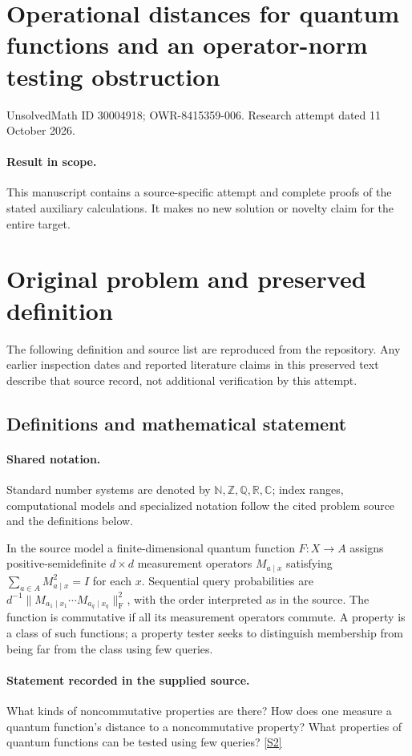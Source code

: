 \documentclass[11pt]{article}
\begin{document}
\section*{Operational distances for quantum functions and an operator-norm testing obstruction}
\noindent UnsolvedMath ID 30004918; OWR-8415359-006. Research attempt dated 11 October 2026.
\paragraph{Result in scope.}This manuscript contains a source-specific attempt and complete proofs of the stated auxiliary calculations. It makes no new solution or novelty claim for the entire target.
\section{Original problem and preserved definition}
The following definition and source list are reproduced from the repository. Any earlier inspection dates and reported literature claims in this preserved text describe that source record, not additional verification by this attempt.
\subsection{Definitions and mathematical statement}

\paragraph{Shared notation.}Standard number systems are denoted by $\mathbb N,\mathbb Z,\mathbb Q,\mathbb R,\mathbb C$; index ranges, computational models and specialized notation follow the cited problem source and the definitions below.


In the source model a finite-dimensional quantum function $F:X\to A$ assigns positive-semidefinite $d\times d$ measurement operators $M_{a\mid x}$ satisfying $\sum_{a\in A}M_{a\mid x}^2=I$ for each $x$. Sequential query probabilities are $d^{-1}\|M_{a_1\mid x_1}\cdots M_{a_q\mid x_q}\|_{\mathrm F}^2$, with the order interpreted as in the source. The function is commutative if all its measurement operators commute. A property is a class of such functions; a property tester seeks to distinguish membership from being far from the class using few queries.
\paragraph{Statement recorded in the supplied source.}
What kinds of noncommutative properties are there? How does one measure a quantum function’s distance to a noncommutative property? What properties of quantum functions can be tested using few queries? \href{https://doi.org/10.4171/owr/2021/54}{[S2]}
\end{document}
